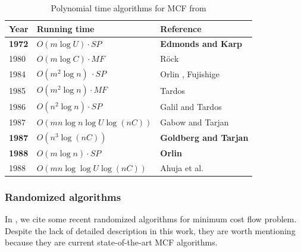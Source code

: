 \begin{table}[ht!]
\centering

\begin{tabular}{@{}lll@{}}
\toprule
\textbf{Year}       & \textbf{Running time}          & \textbf{Reference}  \\        
\midrule
\textbf{1972}      &  \bfseries\boldmath \(O(m \log U) \cdot SP\)               & \textbf{Edmonds and Karp} \cite{edmonds1972} \\
1980      & \(O(m \log C) \cdot MF\) & Röck \cite{rock1980}\\
1984 & \(O(m^2 \log n)\ \cdot SP\) & Orlin \cite{orlin1984}, Fujishige \cite{fujishige1984}\\
1985 & \(O(m^2 \log n) \cdot MF \) & Tardos \cite{tardos1985} \\
1986 & \(O(n^2 \log n) \cdot SP\) & Galil and Tardos \cite{galil1986} \\
1987 & \(O(m n \log n \log  U \log(nC))\) & Gabow and Tarjan \cite{gabow1987} \\
 \textbf{1987} & \bfseries\boldmath\(O(n^3 \log(nC))\) & \textbf{Goldberg and Tarjan} \cite{goldberg-MY} \\
\textbf{1988} & \bfseries\boldmath\(O(m \log n) \cdot SP\) & \textbf{Orlin} \cite{orlin1993faster} \\
1988 & \(O(m n \log \log U \log (nC))\) & Ahuja et al. \cite{ahuja-MY} \\
\bottomrule
\end{tabular}

\caption{Polynomial time algorithms for MCF from \cite{algorithms-survey}}
\label{tab:polyalgs}

\end{table}

\subsubsection{Randomized algorithms}
In , we cite some recent randomized algorithms for minimum cost flow problem. Despite the lack of detailed description in this work, they are worth mentioning because they are current state-of-the-art MCF algorithms.

